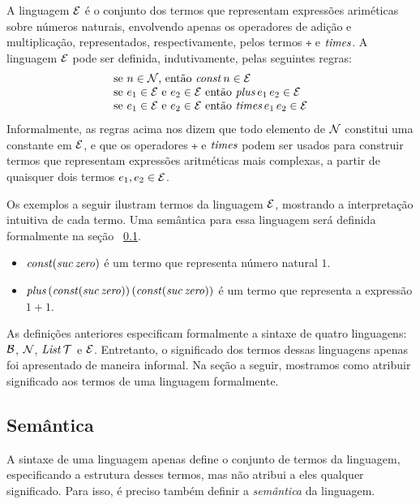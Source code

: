 \begin{Definition}\label{def:arithexp}
 A linguagem $\mathcal{E}$ é o conjunto dos termos que representam expressões ariméticas sobre números naturais, envolvendo apenas os operadores de adição e multiplicação, representados, respectivamente, pelos termos $\tplus$ e $\textit{times\/}$. A linguagem $\mathcal{E}$ pode ser definida, indutivamente, pelas seguintes regras:
  \[
  \begin{tabular}{l}
    se $n\in\Nat$, ent\~ao $\tconst\,n\in\TExp$ \\
    se $e_1 \in \TExp$  e  $e_2 \in \TExp$ ent\~ao $\tplus\,e_1\,e_2\in\TExp$\\
    se $e_1 \in \TExp$  e  $e_2 \in \TExp$ ent\~ao $\ttimes\,e_1\,e_2\in\TExp$
    \end{tabular}
  \]
Informalmente, as regras acima nos dizem que todo elemento de $\mathcal{N}$ constitui uma constante em $\mathcal{E}$, e que os operadores $\tplus$ e $\textit{times\/}$ podem ser usados para construir termos que representam expressões aritméticas mais complexas, a partir de quaisquer dois termos $e_1,e_2\in\mathcal{E}$.
\end{Definition}

\begin{Example}
 Os exemplos a seguir ilustram termos da linguagem $\mathcal{E}$, mostrando a interpretação intuitiva de cada termo. Uma semântica para essa linguagem será definida formalmente na seção ~\ref{cap1:sem}.
  \begin{itemize}
    \item $\textit{const\/} (\textit{suc\/}\, \textit{zero\/})$ é um termo que representa n\'umero natural $1$.
    \item $\textit{plus\/}\, (\textit{const\/} (\textit{suc\/}\, \textit{zero\/}))\, (\textit{const\/} (\textit{suc\/} \,\textit{zero\/}))$ é um termo que representa a express\~ao $1 + 1$.
  \end{itemize}
 \end{Example}

As defini\c{c}\~oes anteriores especificam formalmente a sintaxe de quatro linguagens: $\mathcal{B}$, $\mathcal{N}$, $\textit{List\/}\,\mathcal{T}$ e $\mathcal{E}$.  Entretanto, o significado dos termos dessas linguagens apenas foi apresentado de maneira informal.  Na se\c{c}\~ao a seguir, mostramos como atribuir significado aos termos de uma linguagem formalmente.

\subsection{Sem\^antica}\label{cap1:sem}
A sintaxe de uma linguagem apenas define o conjunto de termos da linguagem, especificando a  estrutura desses termos, mas não atribui a eles qualquer significado. Para isso, é preciso também
definir a \emph{semântica} da linguagem.

